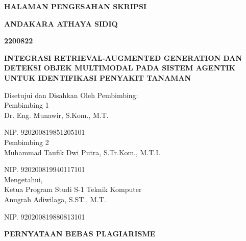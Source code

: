 \documentclass[12pt, a4paper, oneside]{report}
\newcommand{\thesistitle}{INTEGRASI RETRIEVAL-AUGMENTED GENERATION DAN DETEKSI OBJEK MULTIMODAL PADA SISTEM AGENTIK UNTUK IDENTIFIKASI PENYAKIT TANAMAN}
\newcommand{\authorname}{Andakara Athaya Sidiq}
\newcommand{\studentid}{2200822}
\newcommand{\advisorone}{Dr. Eng. Munawir, S.Kom., M.T.}
\newcommand{\advisoronenip}{920200819851205101}
\newcommand{\advisortwo}{Muhammad Taufik Dwi Putra, S.Tr.Kom., M.T.I.}
\newcommand{\advisortwonip}{920200819940117101}
\newcommand{\programhead}{Anugrah Adiwilaga, S.ST., M.T.}
\newcommand{\programheadnip}{920200819880813101}
\begin{document}
\clearpage
{}
\begin{center}
    {\bfseries HALAMAN PENGESAHAN SKRIPSI \par}
    \vspace{\baselineskip}
    {\bfseries \MakeUppercase{\authorname} \par}
    {\bfseries \studentid \par}
    \vspace{\baselineskip}
    {\bfseries \MakeUppercase{\thesistitle} \par}
    \vspace{\baselineskip}
    Disetujui dan Disahkan Oleh Pembimbing: \\
    Pembimbing 1 \\
    \vfill
    \advisorone \par
    NIP. \advisoronenip \\
    \vspace{\baselineskip}
    Pembimbing 2 \\
    \vfill
    \advisortwo \par
    NIP. \advisortwonip \\
    \vspace{\baselineskip}
    Mengetahui, \\
    Ketua Program Studi S-1 Teknik Komputer \\
    \vfill
    \programhead \par
    NIP. \programheadnip
\end{center}
\clearpage

\clearpage
{}
\begin{center}
    {\bfseries PERNYATAAN BEBAS PLAGIARISME \par}
\end{center}
\vspace{\baselineskip}
\end{document}
